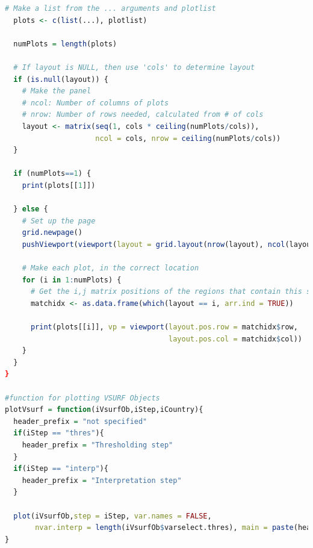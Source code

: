 \documentclass[11pt]{article}
\begin{document}
\begin{lstlisting}[language= R]
  # Make a list from the ... arguments and plotlist
  plots <- c(list(...), plotlist)
  
  numPlots = length(plots)
  
  # If layout is NULL, then use 'cols' to determine layout
  if (is.null(layout)) {
    # Make the panel
    # ncol: Number of columns of plots
    # nrow: Number of rows needed, calculated from # of cols
    layout <- matrix(seq(1, cols * ceiling(numPlots/cols)),
                     ncol = cols, nrow = ceiling(numPlots/cols))
  }
  
  if (numPlots==1) {
    print(plots[[1]])
    
  } else {
    # Set up the page
    grid.newpage()
    pushViewport(viewport(layout = grid.layout(nrow(layout), ncol(layout))))
    
    # Make each plot, in the correct location
    for (i in 1:numPlots) {
      # Get the i,j matrix positions of the regions that contain this subplot
      matchidx <- as.data.frame(which(layout == i, arr.ind = TRUE))
      
      print(plots[[i]], vp = viewport(layout.pos.row = matchidx$row,
                                      layout.pos.col = matchidx$col))
    }
  }
}

#function for plotting VSURF Objects
plotVsurf = function(iVsurfOb,iStep,iCountry){
  header_prefix = "not specified"
  if(iStep == "thres"){
    header_prefix = "Thresholding step"
  }
  if(iStep == "interp"){
    header_prefix = "Interpretation step"
  }
  
  plot(iVsurfOb,step = iStep, var.names = FALSE,
       nvar.interp = length(iVsurfOb$varselect.thres), main = paste(header_prefix,iCountry))
}

\end{lstlisting}
\end{document}
